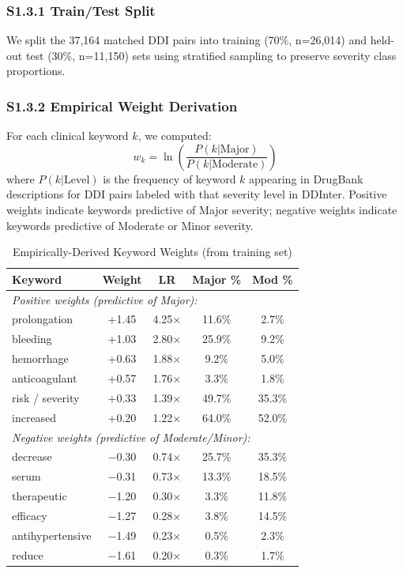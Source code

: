 \documentclass[11pt,a4paper]{article}
\begin{document}
\subsubsection{S1.3.1 Train/Test Split}

We split the 37,164 matched DDI pairs into training (70\%, n=26,014) and held-out test (30\%, n=11,150) sets using stratified sampling to preserve severity class proportions.

\subsubsection{S1.3.2 Empirical Weight Derivation}

For each clinical keyword $k$, we computed:
\begin{equation}
w_k = \ln\left(\frac{P(k|\text{Major})}{P(k|\text{Moderate})}\right)
\end{equation}
where $P(k|\text{Level})$ is the frequency of keyword $k$ appearing in DrugBank descriptions for DDI pairs labeled with that severity level in DDInter. Positive weights indicate keywords predictive of Major severity; negative weights indicate keywords predictive of Moderate or Minor severity.

\begin{table}[H]
\centering
\caption{Empirically-Derived Keyword Weights (from training set)}
\label{tab:empirical_weights}
\begin{tabular}{@{}lcccc@{}}
\toprule
\textbf{Keyword} & \textbf{Weight} & \textbf{LR} & \textbf{Major \%} & \textbf{Mod \%} \\
\midrule
\multicolumn{5}{l}{\textit{Positive weights (predictive of Major):}} \\
prolongation & +1.45 & 4.25$\times$ & 11.6\% & 2.7\% \\
bleeding & +1.03 & 2.80$\times$ & 25.9\% & 9.2\% \\
hemorrhage & +0.63 & 1.88$\times$ & 9.2\% & 5.0\% \\
anticoagulant & +0.57 & 1.76$\times$ & 3.3\% & 1.8\% \\
risk / severity & +0.33 & 1.39$\times$ & 49.7\% & 35.3\% \\
increased & +0.20 & 1.22$\times$ & 64.0\% & 52.0\% \\
\midrule
\multicolumn{5}{l}{\textit{Negative weights (predictive of Moderate/Minor):}} \\
decrease & $-$0.30 & 0.74$\times$ & 25.7\% & 35.3\% \\
serum & $-$0.31 & 0.73$\times$ & 13.3\% & 18.5\% \\
therapeutic & $-$1.20 & 0.30$\times$ & 3.3\% & 11.8\% \\
efficacy & $-$1.27 & 0.28$\times$ & 3.8\% & 14.5\% \\
antihypertensive & $-$1.49 & 0.23$\times$ & 0.5\% & 2.3\% \\
reduce & $-$1.61 & 0.20$\times$ & 0.3\% & 1.7\% \\
\bottomrule
\end{tabular}
\end{table}
\end{document}
